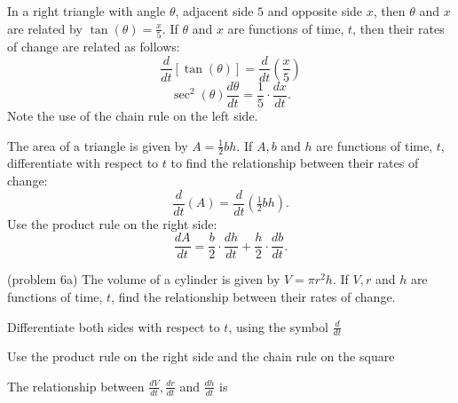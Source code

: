 \documentclass{ximera}
\begin{document}
\begin{example}[example 5]
In a right triangle with angle $\theta$, adjacent side $5$ and opposite side $x$, then 
$\theta$ and $x$ are related by $\tan (\theta) = \frac{x}{5}$. If $\theta$ and $x$ are functions of time, $t$, 
then their rates of change are related as follows:
\[\frac{d}{dt}[\tan (\theta)] = \frac{d}{dt} \left(\frac{x}{5}\right)\]
\[\sec^2(\theta) \frac{d\theta}{dt} = \frac{1}{5} \cdot \frac{dx}{dt}.\]
Note the use of the chain rule on the left side.
\end{example}



\begin{example}[example 6]
The area of a triangle is given by $A = \frac{1}{2} bh$. If $A, b$ and $h$ are functions of time, $t$, 
differentiate with respect to $t$ to find the relationship between their rates of change:
\[\frac{d}{dt}(A) = \frac{d}{dt}(\tfrac{1}{2} bh).\]
Use the product rule on the right side:
\[\frac{dA}{dt} = \frac{b}{2} \cdot \frac{dh}{dt}+ \frac{h}{2} \cdot \frac{db}{dt}.\]
\end{example}

\begin{problem}(problem 6a)
The volume of a cylinder is given by $V = \pi r^2h$. If $V, r$ and $h$ are functions of time, $t$,
find the relationship between their rates of change.\\
\begin{hint}
Differentiate both sides with respect to $t$, using the symbol $\frac{d}{dt}$
\end{hint}
\begin{hint}
Use the product rule on the right side and the chain rule on the square
\end{hint}

The relationship between $\frac{dV}{dt}, \frac{dr}{dt}$ and $\frac{dh}{dt}$ is
\begin{multipleChoice}
\end{multipleChoice}
\end{problem}
\end{document}
